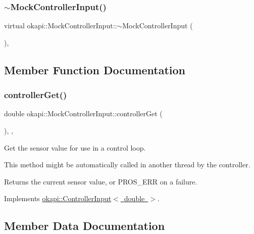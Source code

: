 \subsubsection{\texorpdfstring{$\sim$MockControllerInput()}{~MockControllerInput()}}
{\footnotesize\ttfamily virtual okapi\+::\+Mock\+Controller\+Input\+::$\sim$\+Mock\+Controller\+Input (\begin{DoxyParamCaption}{ }\end{DoxyParamCaption})\hspace{0.3cm}{\ttfamily [virtual]}, {\ttfamily [default]}}



\subsection{Member Function Documentation}
\mbox{\label{classokapi_1_1MockControllerInput_afb1bf896f873aeca0cc2c677f4a90cc0}} 
\subsubsection{\texorpdfstring{controllerGet()}{controllerGet()}}
{\footnotesize\ttfamily double okapi\+::\+Mock\+Controller\+Input\+::controller\+Get (\begin{DoxyParamCaption}{ }\end{DoxyParamCaption})\hspace{0.3cm}{\ttfamily [inline]}, {\ttfamily [override]}, {\ttfamily [virtual]}}



Get the sensor value for use in a control loop. 

This method might be automatically called in another thread by the controller.

\begin{DoxyReturn}{Returns}
the current sensor value, or {\ttfamily P\+R\+O\+S\+\_\+\+E\+RR} on a failure. 
\end{DoxyReturn}


Implements \mbox{\hyperlink{classokapi_1_1ControllerInput_a3c6c86d897983f367928a93890551e17}{okapi\+::\+Controller\+Input$<$ double $>$}}.



\subsection{Member Data Documentation}
\mbox{\label{classokapi_1_1MockControllerInput_a9fe81baaaabb4b7d2eb5e0782bd93873}} 
